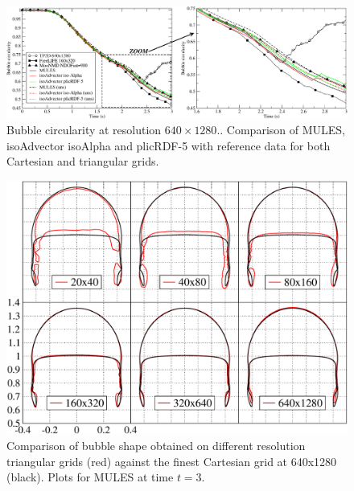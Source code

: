 \documentclass[review]{elsarticle}
\begin{document}
\begin{figure}[!h]
  \includegraphics[width=\textwidth]{figures/HysingB_bubble_circularity_640x1280.pdf}
  \caption{Bubble circularity at resolution $640\times1280.$. Comparison of MULES, isoAdvector isoAlpha and plicRDF-5 with reference data for both Cartesian and triangular grids.}
  \label{fig:HB_bubble_circularity640}
\end{figure}


\begin{figure}[!h]
  \includegraphics[width=\textwidth]{figures/bubble_shape_t=3_compareOFMULES_Fineststruct_vs_uns_grids.pdf}
  \caption{Comparison of bubble shape obtained on different resolution triangular grids (red) against the finest Cartesian grid at 640x1280 (black). Plots for MULES at time $t=3$.}
  \label{fig:HB_compareOFMULES_Fineststruct.vs.uns}
\end{figure}
\end{document}
